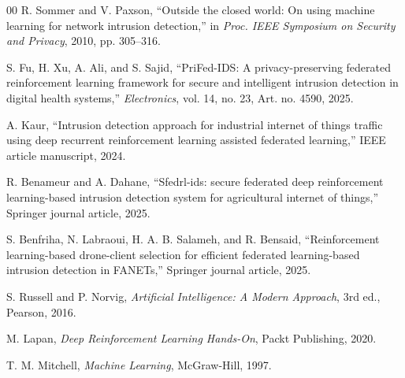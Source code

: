 \documentclass[conference]{IEEEtran}
\begin{document}
\begin{thebibliography}{00}
R. Sommer and V. Paxson,
``Outside the closed world: On using machine learning for network intrusion detection,''
in \textit{Proc. IEEE Symposium on Security and Privacy}, 2010, pp. 305--316.

S. Fu, H. Xu, A. Ali, and S. Sajid,
``PriFed-IDS: A privacy-preserving federated reinforcement learning framework for secure and intelligent intrusion detection in digital health systems,''
\textit{Electronics}, vol. 14, no. 23, Art. no. 4590, 2025.

A. Kaur,
``Intrusion detection approach for industrial internet of things traffic using deep recurrent reinforcement learning assisted federated learning,''
IEEE article manuscript, 2024.

R. Benameur and A. Dahane,
``Sfedrl-ids: secure federated deep reinforcement learning-based intrusion detection system for agricultural internet of things,''
Springer journal article, 2025.

S. Benfriha, N. Labraoui, H. A. B. Salameh, and R. Bensaid,
``Reinforcement learning-based drone-client selection for efficient federated learning-based intrusion detection in FANETs,''
Springer journal article, 2025.

S. Russell and P. Norvig,
\textit{Artificial Intelligence: A Modern Approach}, 3rd ed., Pearson, 2016.

M. Lapan,
\textit{Deep Reinforcement Learning Hands-On}, Packt Publishing, 2020.

T. M. Mitchell,
\textit{Machine Learning}, McGraw-Hill, 1997.

\end{thebibliography}
\end{document}
